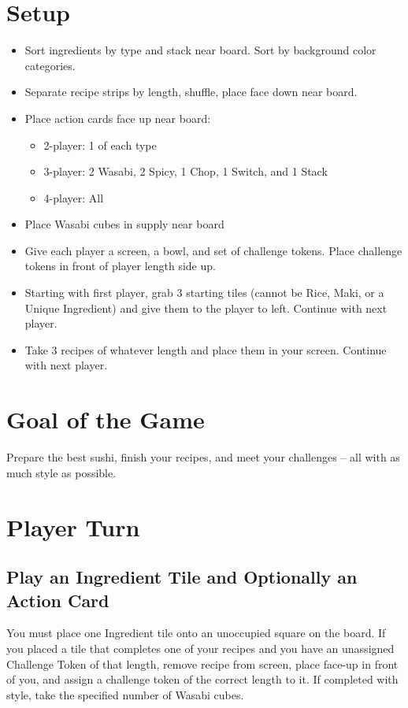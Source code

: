 \documentclass[12pt]{article}
\newenvironment{itemizeCustom}
{\begin{itemize}
  \setlength{\itemsep}{1pt}
  \setlength{\parskip}{0pt}
  \setlength{\parsep}{0pt}}
{\end{itemize}}
\begin{document}
\begin{mdframed}[style = customFrame]
\begin{multicols*}{2}

\section*{Setup}
\begin{itemizeCustom}
    \item Sort ingredients by type and stack near board. Sort by background color categories.
    \item Separate recipe strips by length, shuffle, place face down near board.
    \item Place action cards face up near board:
        \begin{itemizeCustom}
            \item 2-player: 1 of each type
            \item 3-player: 2 Wasabi, 2 Spicy, 1 Chop, 1 Switch, and 1 Stack
            \item 4-player: All
        \end{itemizeCustom}
    \item Place Wasabi cubes in supply near board
    \item Give each player a screen, a bowl, and set of challenge tokens. Place challenge tokens in front of player length side up.
    \item Starting with first player, grab 3 starting tiles (cannot be Rice, Maki, or a Unique Ingredient) and give them to the player to left. Continue with next player.
    \item Take 3 recipes of whatever length and place them in your screen. Continue with next player.
\end{itemizeCustom}

\section*{Goal of the Game}
Prepare the best sushi, finish your recipes, and meet your challenges -- all with as much style as possible.

\section*{Player Turn}
\subsection*{Play an Ingredient Tile and Optionally an Action Card}
You must place one Ingredient tile onto an unoccupied square on the board. If you placed a tile that completes one of your recipes and you have an unassigned Challenge Token of that length, remove recipe from screen, place face-up in front of you, and assign a challenge token of the correct length to it. If completed with style, take the specified number of Wasabi cubes.


\end{multicols*}
\end{mdframed}
\end{document}
